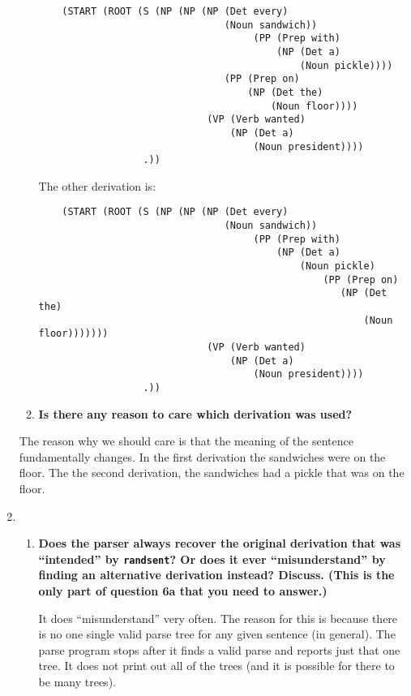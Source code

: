 \documentclass[10pt]{article}
\begin{document}
\begin{enumerate}
\begin{enumerate}
\bigskip
\begin{verbatim}
    (START (ROOT (S (NP (NP (NP (Det every)
                                (Noun sandwich))
                                     (PP (Prep with)
                                         (NP (Det a)
                                             (Noun pickle))))
                                (PP (Prep on)
                                    (NP (Det the)
                                        (Noun floor))))
                             (VP (Verb wanted)
                                 (NP (Det a)
                                     (Noun president))))
                  .))
\end{verbatim}

The other derivation is: 

\bigskip
\begin{verbatim}
    (START (ROOT (S (NP (NP (NP (Det every)
                                (Noun sandwich))
                                     (PP (Prep with)
                                         (NP (Det a)
                                             (Noun pickle)
                                                 (PP (Prep on)
                                                    (NP (Det the)
                                                        (Noun floor)))))))
                             (VP (Verb wanted)
                                 (NP (Det a)
                                     (Noun president))))
                  .))
\end{verbatim}


\item {\bf Is there any reason to care which derivation was used?}
\end{enumerate}

The reason why we should care is that the meaning of the sentence fundamentally changes. In the first derivation the sandwiches were on the floor. The the second derivation, the sandwiches had a pickle that was on the floor.

\item\begin{enumerate}
 \item {\bf Does the parser
  always recover the original derivation that was ``intended'' by
  \verb|randsent|? Or does it ever ``misunderstand'' by finding an alternative
  derivation instead?  Discuss. (This is the only part of question 6a
  that you need to answer.)}

It does ``misunderstand'' very often. The reason for this is because there is no one single valid parse tree for any given sentence (in general). The parse program stops after it finds a valid parse and reports just that one tree. It does not print out all of the trees (and it is possible for there to be many trees).


\end{enumerate}
\end{enumerate}
\end{document}
